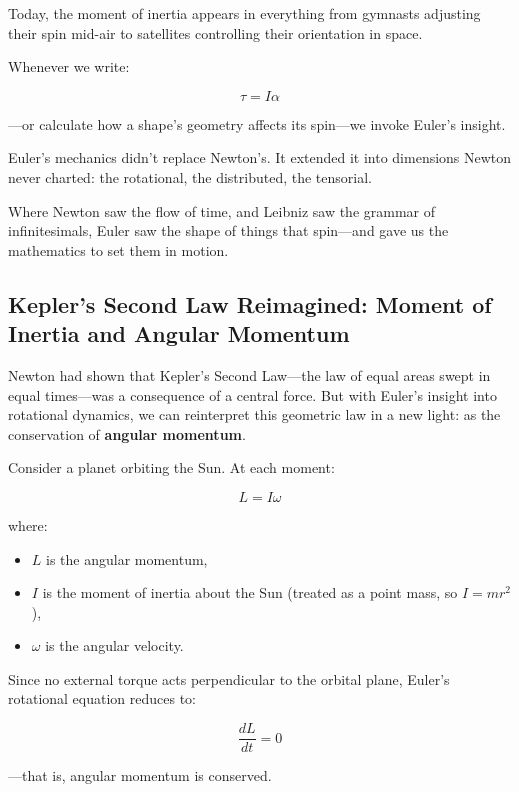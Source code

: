 Today, the moment of inertia appears in everything from gymnasts adjusting their spin mid-air to 
satellites controlling their orientation in space.

Whenever we write:

\[
\tau = I \alpha
\]

—or calculate how a shape’s geometry affects its spin—we invoke Euler’s insight.

Euler’s mechanics didn’t replace Newton’s. It extended it into dimensions Newton never charted: the rotational, 
the distributed, the tensorial.

Where Newton saw the flow of time, and Leibniz saw the grammar of infinitesimals, Euler saw the shape of 
things that spin—and gave us the mathematics to set them in motion.

\subsection{Kepler’s Second Law Reimagined: Moment of Inertia and Angular Momentum}

Newton had shown that Kepler’s Second Law—the law of equal areas swept in equal times—was a consequence 
of a central force. But with Euler’s insight into rotational dynamics, we can reinterpret this geometric 
law in a new light: as the conservation of \textbf{angular momentum}.

Consider a planet orbiting the Sun. At each moment:

\[
L = I \omega
\]

where:

\begin{itemize}
    \item \( L \) is the angular momentum,
    \item \( I \) is the moment of inertia about the Sun (treated as a point mass, so \( I = m r^2 \)),
    \item \( \omega \) is the angular velocity.
\end{itemize}

Since no external torque acts perpendicular to the orbital plane, Euler’s rotational equation reduces to:

\[
\frac{dL}{dt} = 0
\]

—that is, angular momentum is conserved.


